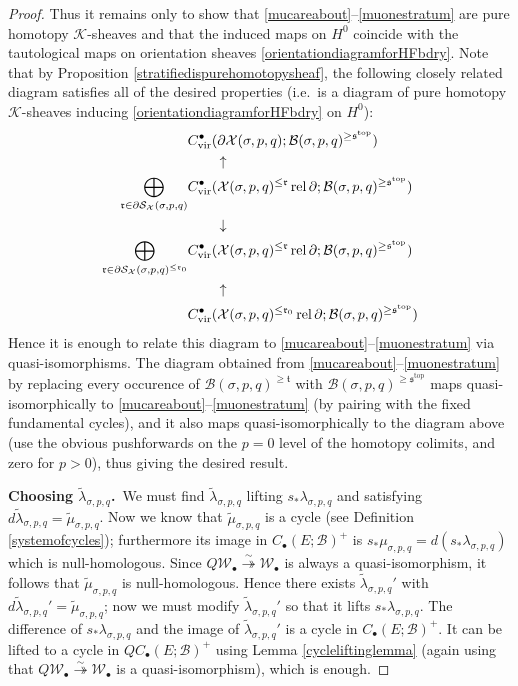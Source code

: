 \documentclass[12pt]{article}
\theoremstyle{definition}
\theoremstyle{remark}
\numberwithin{equation}{subsection}
\newcommand{\K}{\mathcal K}
\newcommand{\W}{\mathcal W}
\newcommand{\s}{\mathfrak s}
\newcommand{\ttt}{\mathfrak t}
\newcommand{\rr}{\mathfrak r}
\newcommand{\X}{\mathcal X}
\newcommand{\SSS}{\mathcal S}
\newcommand{\ttop}{\mathrm{top}}
\newcommand{\B}{\mathcal B}
\newcommand{\vir}{\mathrm{vir}}
\newcommand{\rel}{\operatorname{rel}}
\begin{document}
\begin{proof}
Thus it remains only to show that \eqref{mucareabout}--\eqref{muonestratum} are pure homotopy $\K$-sheaves and that the induced maps on $H^0$ coincide with the tautological maps on orientation sheaves \eqref{orientationdiagramforHFbdry}.  Note that by Proposition \ref{stratifiedispurehomotopysheaf}, the following closely related diagram satisfies all of the desired properties (i.e.\ is a diagram of pure homotopy $\K$-sheaves inducing \eqref{orientationdiagramforHFbdry} on $H^0$):
\begin{align}
&C_\vir^\bullet(\partial\X(\sigma,p,q);\B(\sigma,p,q)^{\geq\s^\ttop})\\
&\qquad\uparrow\cr
\bigoplus_{\rr\in\partial\SSS_\X(\sigma,p,q)}&C_\vir^\bullet(\X(\sigma,p,q)^{\leq\rr}\rel\partial;\B(\sigma,p,q)^{\geq\s^\ttop})\\
&\qquad\downarrow\cr
\bigoplus_{\rr\in\partial\SSS_\X(\sigma,p,q)^{\leq\rr_0}}&C_\vir^\bullet(\X(\sigma,p,q)^{\leq\rr}\rel\partial;\B(\sigma,p,q)^{\geq\s^\ttop})\\
&\qquad\uparrow\cr
&C_\vir^\bullet(\X(\sigma,p,q)^{\leq\rr_0}\rel\partial;\B(\sigma,p,q)^{\geq\s^\ttop})
\end{align}
Hence it is enough to relate this diagram to \eqref{mucareabout}--\eqref{muonestratum} via quasi-isomorphisms.  The diagram obtained from \eqref{mucareabout}--\eqref{muonestratum} by replacing every occurence of $\B(\sigma,p,q)^{\geq\ttt}$ with $\B(\sigma,p,q)^{\geq\s^\ttop}$ maps quasi-isomorphically to \eqref{mucareabout}--\eqref{muonestratum} (by pairing with the fixed fundamental cycles), and it also maps quasi-isomorphically to the diagram above (use the obvious pushforwards on the $p=0$ level of the homotopy colimits, and zero for $p>0$), thus giving the desired result.

\textbf{Choosing $\tilde\lambda_{\sigma,p,q}$.}\  We must find $\tilde\lambda_{\sigma,p,q}$ lifting $s_\ast\lambda_{\sigma,p,q}$ and satisfying $d\tilde\lambda_{\sigma,p,q}=\tilde\mu_{\sigma,p,q}$.  Now we know that $\tilde\mu_{\sigma,p,q}$ is a cycle (see Definition \ref{systemofcycles}); furthermore its image in $C_\bullet(E;\B)^+$ is $s_\ast\mu_{\sigma,p,q}=d(s_\ast\lambda_{\sigma,p,q})$ which is null-homologous.  Since $Q\W_\bullet\overset\sim\twoheadrightarrow\W_\bullet$ is always a quasi-isomorphism, it follows that $\tilde\mu_{\sigma,p,q}$ is null-homologous.  Hence there exists $\tilde\lambda_{\sigma,p,q}'$ with $d\tilde\lambda_{\sigma,p,q}'=\tilde\mu_{\sigma,p,q}$; now we must modify $\tilde\lambda_{\sigma,p,q}'$ so that it lifts $s_\ast\lambda_{\sigma,p,q}$.  The difference of $s_\ast\lambda_{\sigma,p,q}$ and the image of $\tilde\lambda_{\sigma,p,q}'$ is a cycle in $C_\bullet(E;\B)^+$.  It can be lifted to a cycle in $QC_\bullet(E;\B)^+$ using Lemma \ref{cycleliftinglemma} (again using that $Q\W_\bullet\overset\sim\twoheadrightarrow\W_\bullet$ is a quasi-isomorphism), which is enough.
\end{proof}
\end{document}
